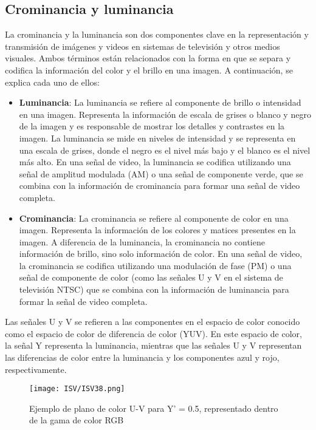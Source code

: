 \documentclass[
	12pt, %
	fleqn, %
	a4paper, %
	oneside, %
]{LegrandOrangeBook}
\begin{document}
\subsection{Crominancia y luminancia}
La crominancia y la luminancia son dos componentes clave en la representación y transmisión de imágenes y videos en sistemas de televisión y otros medios visuales. Ambos términos están relacionados con la forma en que se separa y codifica la información del color y el brillo en una imagen. A continuación, se explica cada uno de ellos:
\begin{itemize}
\item \textbf{Luminancia}: La luminancia se refiere al componente de brillo o intensidad en una imagen. Representa la información de escala de grises o blanco y negro de la imagen y es responsable de mostrar los detalles y contrastes en la imagen. La luminancia se mide en niveles de intensidad y se representa en una escala de grises, donde el negro es el nivel más bajo y el blanco es el nivel más alto.
En una señal de video, la luminancia se codifica utilizando una señal de amplitud modulada (AM) o una señal de componente verde, que se combina con la información de crominancia para formar una señal de video completa.

\item \textbf{Crominancia}: La crominancia se refiere al componente de color en una imagen. Representa la información de los colores y matices presentes en la imagen. A diferencia de la luminancia, la crominancia no contiene información de brillo, sino solo información de color.
En una señal de video, la crominancia se codifica utilizando una modulación de fase (PM) o una señal de componente de color (como las señales U y V en el sistema de televisión NTSC) que se combina con la información de luminancia para formar la señal de video completa.
\end{itemize}
\begin{notation}
Las señales U y V se refieren a las componentes en el espacio de color conocido como el espacio de color de diferencia de color (YUV). En este espacio de color, la señal Y representa la luminancia, mientras que las señales U y V representan las diferencias de color entre la luminancia y los componentes azul y rojo, respectivamente.
\end{notation}
\begin{figure}[H]
\centering
\texttt{[image: ISV/ISV38.png]}
\caption{Ejemplo de plano de color U-V para Y' = 0.5, representado dentro de la gama de color RGB}
\end{figure}
\end{document}
